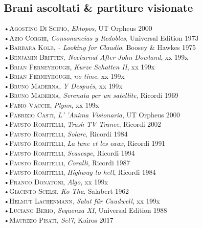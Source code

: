 \documentclass[oneside]{article}
\begin{document}
\begin{multicols*}{2}
\section{ Brani ascoltati \& partiture visionate}
•\textsc{\textsf {Agostino Di Scipio}}, \emph{Ektopos}, UT Orpheus 2000\\
•\textsc{\textsf {Azio Corghi}}, \emph{Consonancias y Redobles}, Universal Edition 1973\\
•\textsc{\textsf {Barbara Kolb}}, \emph{ - Looking for Claudio}, Boosey \& Hawkes 1975\\
•\textsc{\textsf {Benjamin Britten}}, \emph{Nocturnal After John Dowland}, xx 199x\\
•\textsc{\textsf {Brian Ferneyhough}}, \emph{Kurze Schatten II}, xx 199x\\
•\textsc{\textsf {Brian Ferneyhough}}, \emph{no time}, xx 199x\\
•\textsc{\textsf {Bruno Maderna}}, \emph{Y Después}, xx 199x\\
•\textsc{\textsf {Bruno Maderna}}, \emph{Serenata per un satellite}, Ricordi 1969\\
•\textsc{\textsf {Fabio Vacchi}}, \emph{Plynn}, xx 199x\\
•\textsc{\textsf {Fabrizio Casti}}, \emph{ L' 'Anima Visionaria}, UT Orpheus 2000\\
•\textsc{\textsf {Fausto Romitelli}}, \emph{Trash TV Trance}, Ricordi 2002\\
•\textsc{\textsf {Fausto Romitelli}}, \emph{Solare}, Ricordi 1984\\
•\textsc{\textsf {Fausto Romitelli}}, \emph{La lune et les eaux}, Ricordi 1991\\
•\textsc{\textsf {Fausto Romitelli}}, \emph{Seascape}, Ricordi 1994\\
•\textsc{\textsf {Fausto Romitelli}}, \emph{Coralli}, Ricordi 1987\\
•\textsc{\textsf {Fausto Romitelli}}, \emph{Highway to hell}, Ricordi 1984\\
•\textsc{\textsf {Franco Donatoni}}, \emph{Algo}, xx 199x\\
•\textsc{\textsf {Giacinto Scelsi}}, \emph{Ko-Tha}, Salabert 1962\\
•\textsc{\textsf {Helmut Lachenmann}}, \emph{Salut für Caudwell}, xx 199x\\
•\textsc{\textsf {Luciano Berio}}, \emph{Sequenza XI}, Universal Edition 1988\\
•\textsc{\textsf {Maurizio Pisati}}, \emph{Set7}, Kairos 2017\\

\end{multicols*}
\end{document}
